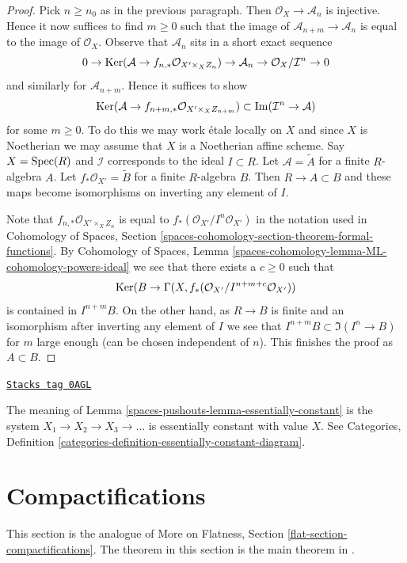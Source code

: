\begin{proof}
\medskip\noindent
Pick $n \geq n_0$ as in the previous paragraph. Then
$\mathcal{O}_X \to \mathcal{A}_n$ is injective. Hence it now
suffices to find $m \geq 0$ such that the image of
$\mathcal{A}_{n + m} \to \mathcal{A}_n$ is equal
to the image of $\mathcal{O}_X$. Observe that $\mathcal{A}_n$
sits in a short exact sequence
$$
0 \to \operatorname{Ker}(\mathcal{A} \to f_{n, *}\mathcal{O}_{X' \times_X Z_n})
\to \mathcal{A}_n \to \mathcal{O}_X/\mathcal{I}^n \to 0
$$
and similarly for $\mathcal{A}_{n + m}$. Hence it suffices to show
$$
\operatorname{Ker}(\mathcal{A} \to f_{n + m, *}\mathcal{O}_{X' \times_X Z_{n + m}})
\subset
\operatorname{Im}(\mathcal{I}^n \to \mathcal{A})
$$
for some $m \geq 0$. To do this we may work \'etale locally on
$X$ and since $X$ is Noetherian we may assume that $X$ is
a Noetherian affine scheme. Say $X = \operatorname{Spec}(R)$ and $\mathcal{I}$
corresponds to the ideal $I \subset R$. Let $\mathcal{A} = \widetilde{A}$
for a finite $R$-algebra $A$. Let $f_*\mathcal{O}_{X'} = \widetilde{B}$
for a finite $R$-algebra $B$. Then $R \to A \subset B$ and these maps
become isomorphisms on inverting any element of $I$.

\medskip\noindent
Note that $f_{n, *}\mathcal{O}_{X' \times_X Z_n}$
is equal to $f_*(\mathcal{O}_{X'}/I^n\mathcal{O}_{X'})$
in the notation used in Cohomology of Spaces, Section
\ref{spaces-cohomology-section-theorem-formal-functions}.
By Cohomology of Spaces, Lemma
\ref{spaces-cohomology-lemma-ML-cohomology-powers-ideal}
we see that there exists a $c \geq 0$ such that
$$
\operatorname{Ker}(B \to \Gamma(X, f_*(\mathcal{O}_{X'}/I^{n + m + c}\mathcal{O}_{X'}))
$$
is contained in $I^{n + m}B$. On the other hand, as $R \to B$ is
finite and an isomorphism after inverting any element of $I$
we see that $I^{n + m}B \subset \Im(I^n \to B)$ for $m$ large enough
(can be chosen independent of $n$). This finishes the proof as $A \subset B$.
\end{proof}

\begin{remark}
\label{spaces-pushouts-remark-essentially-constant}
\href{https://stacks.math.columbia.edu/tag/0AGL}{\texttt{Stacks tag 0AGL}}

The meaning of Lemma \ref{spaces-pushouts-lemma-essentially-constant}
is the system $X_1 \to X_2 \to X_3 \to \ldots$ is essentially
constant with value $X$. See Categories, Definition
\ref{categories-definition-essentially-constant-diagram}.
\end{remark}

\section{Compactifications}
\label{spaces-pushouts-section-compactifications}
This section is the analogue of More on Flatness, Section
\ref{flat-section-compactifications}. The theorem in this
section is the main theorem in \cite{CLO}.

